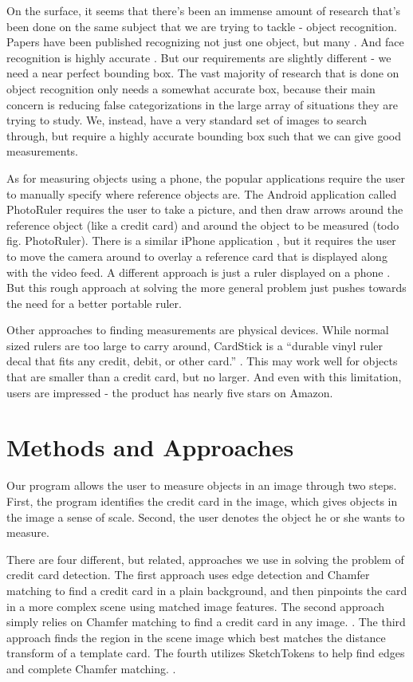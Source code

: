 \documentclass[10pt,twocolumn,letterpaper]{article}
\begin{document}
On the surface, it seems that there’s been an immense amount of research that’s been done on the same subject that we are trying to tackle - object recognition. Papers have been published recognizing not just one object, but many \cite{ObjectDetection}. And face recognition is highly accurate \cite{FaceDetection}. But our requirements are slightly different - we need a near perfect bounding box. The vast majority of research that is done on object recognition only needs a somewhat accurate box, because their main concern is reducing false categorizations in the large array of situations they are trying to study. We, instead, have a very standard set of images to search through, but require a highly accurate bounding box such that we can give good measurements.

As for measuring objects using a phone, the popular applications require the user to manually specify where reference objects are. The Android application called PhotoRuler \cite{PhotoRuler} requires the user to take a picture, and then draw arrows around the reference object (like a credit card) and around the object to be measured (todo fig. PhotoRuler). There is a similar iPhone application \cite{RulerPhone}, but it requires the user to move the camera around to overlay a reference card that is displayed along with the video feed. A different approach is just a ruler displayed on a phone \cite{SmartRuler}. But this rough approach at solving the more general problem just pushes towards the need for a better portable ruler.

Other approaches to finding measurements are physical devices. While normal sized rulers are too large to carry around, CardStick is a “durable vinyl ruler decal that fits any credit, debit, or other card.” \cite{CardStick}. This may work well for objects that are smaller than a credit card, but no larger. And even with this limitation, users are impressed - the product has nearly five stars on Amazon.

\section{Methods and Approaches}
Our program allows the user to measure objects in an image through two steps. First, the program identifies the credit card in the image, which gives objects in the image a sense of scale. Second, the user denotes the object he or she wants to measure. 

There are four different, but related, approaches we use in solving the problem of credit card detection. The first approach uses edge detection and Chamfer matching to find a credit card in a plain background, and then pinpoints the card in a more complex scene using matched image features. The second approach simply relies on Chamfer matching to find a credit card in any image. \cite{chamfer}. The third approach finds the region in the scene image which best matches the distance transform of a template card. The fourth utilizes SketchTokens to help find edges and complete Chamfer matching. \cite{SketchTokens}. 
\end{document}
